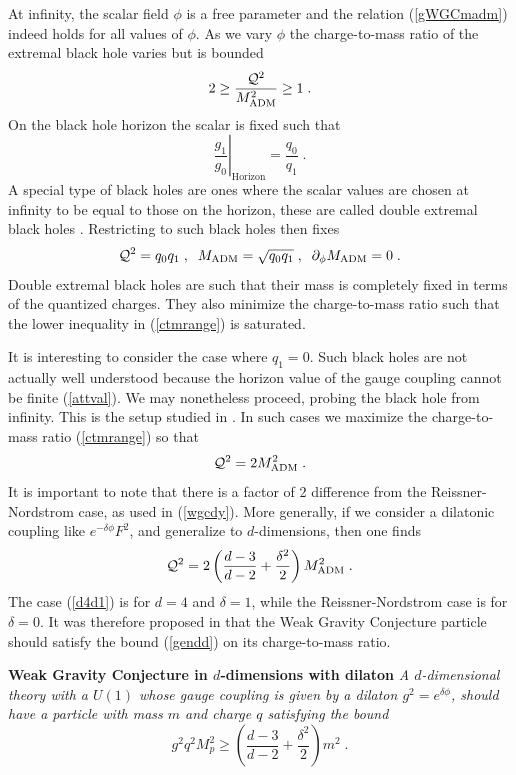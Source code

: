 \documentclass[11pt,a4paper]{article}
\numberwithin{equation}{section}
\numberwithin{table}{section}\setlength{\multlinegap}{25pt}
\newcommand{\be}{\begin{equation}}
\newcommand{\ee}{\end{equation}}
\begin{document}
At infinity, the scalar field $\phi$ is a free parameter and the relation (\ref{gWGCmadm}) indeed holds for all values of $\phi$. As we vary $\phi$ the charge-to-mass ratio of the extremal black hole varies but is bounded
\be
\label{ctmrange}
2\geq \frac{{\cal Q}^2}{M_{\mathrm{ADM}}^2} \geq 1 \;.
\ee
On the black hole horizon the scalar is fixed such that 
\be
\label{attval}
\left. \frac{g_1}{g_0} \right|_{\mathrm{Horizon}} = \frac{q_0}{q_1} \;.
\ee
A special type of black holes are ones where the scalar values are chosen at infinity to be equal to those on the horizon, these are called double extremal black holes \cite{Kallosh:1996tf}. Restricting to such black holes then fixes 
\be
{\cal Q}^2 = q_0 q_1 \;,\;\; M_{\mathrm{ADM}} = \sqrt{q_0 q_1} \;,\;\; \partial_{\phi} M_{\mathrm{ADM}} = 0\;.
\ee
Double extremal black holes are such that their mass is completely fixed in terms of the quantized charges. They also minimize the charge-to-mass ratio such that the lower inequality in (\ref{ctmrange}) is saturated. 

It is interesting to consider the case where $q_1=0$. Such black holes are not actually well understood because the horizon value of the gauge coupling cannot be finite (\ref{attval}). We may nonetheless proceed, probing the black hole from infinity. This is the setup studied in \cite{Heidenreich:2015nta}. In such cases we maximize the charge-to-mass ratio (\ref{ctmrange}) so that 
\be
\label{d4d1}
{\cal Q}^2 = 2M_{\mathrm{ADM}}^2\;.
\ee
It is important to note that there is a factor of 2 difference from the Reissner-Nordstrom case, as used in (\ref{wgcdy}). More generally, if we consider a dilatonic coupling like $e^{-\delta \phi} F^2$, and generalize to $d$-dimensions, then one finds \cite{Horowitz:1991cd,Heidenreich:2015nta}
\be
\label{gendd}
{\cal Q}^2 = 2\left(  \frac{d-3}{d-2} + \frac{\delta^2}{2} \right)M_{\mathrm{ADM}}^2 \;.
\ee
The case (\ref{d4d1}) is for $d=4$ and $\delta=1$, while the Reissner-Nordstrom case is for $\delta=0$. It was therefore proposed in \cite{Heidenreich:2015nta} that the Weak Gravity Conjecture particle should satisfy the bound (\ref{gendd}) on its charge-to-mass ratio.

\begin{tcolorbox}
{\bf Weak Gravity Conjecture in $d$-dimensions with dilaton} \;\cite{Heidenreich:2015nta}
{\it 
\newline
\newline
A $d$-dimensional theory with a $U(1)$ whose gauge coupling is given by a dilaton $g^2=e^{\delta \phi}$, should have a particle with mass $m$ and charge $q$ satisfying the bound
\be
\label{wgcscdd}
g^2 q^2 M_p^2 \geq \left(  \frac{d-3}{d-2} + \frac{\delta^2}{2} \right) m^2 \;.
\ee 
}
\end{tcolorbox}
\end{document}
